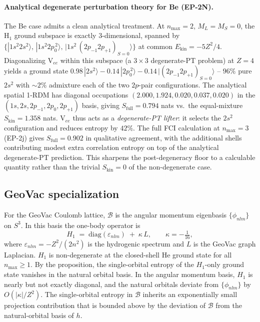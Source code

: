 \documentclass[twocolumn,pra,amsmath,amssymb,superscriptaddress]{revtex4-2}
\begin{document}
\paragraph*{Analytical degenerate perturbation theory for Be
(EP-2N).}  The Be case admits a clean analytical treatment.
At $n_{\max}=2$, $M_L=M_S=0$, the H$_1$ ground subspace
is exactly $3$-dimensional, spanned by
$\{|1s^{2}2s^{2}\rangle,\, |1s^{2}2p_{0}^{\,2}\rangle,\,
|1s^{2}\,(2p_{-1}2p_{+1})_{S=0}\rangle\}$ at common
$E_{\mathrm{kin}} = -5Z^{2}/4$.  Diagonalizing V$_{ee}$ within
this subspace (a $3\times 3$ degenerate-PT problem) at $Z=4$
yields a ground state $0.98\,|2s^{2}\rangle - 0.14\,|2p_{0}^{\,2}\rangle
- 0.14\,|(2p_{-1}2p_{+1})_{S=0}\rangle$ -- $96\%$ pure
$2s^{2}$ with $\sim 2\%$ admixture each of the two
$2p$-pair configurations.  The analytical spatial 1-RDM has
diagonal occupations $(2.000, 1.924, 0.020, 0.037, 0.020)$ in
the $(1s, 2s, 2p_{-1}, 2p_{0}, 2p_{+1})$ basis, giving
$S_{\mathrm{full}} = 0.794$ nats vs.\ the equal-mixture
$S_{\mathrm{kin}} = 1.358$ nats.  V$_{ee}$ thus acts as a
\emph{degenerate-PT lifter}: it selects the $2s^{2}$
configuration and reduces entropy by $42\%$.  The full FCI
calculation at $n_{\max}=3$ (EP-2j) gives $S_{\mathrm{full}}
= 0.902$ in qualitative agreement, with the additional
shells contributing modest extra correlation entropy on top of
the analytical degenerate-PT prediction.  This sharpens the
post-degeneracy floor to a calculable quantity rather than
the trivial $S_{\mathrm{kin}}=0$ of the non-degenerate case.

\subsection{GeoVac specialization}

For the GeoVac Coulomb lattice, $\mathcal{B}$ is the angular
momentum eigenbasis $\{\phi_{nlm}\}$ on $S^{3}$.  In this basis
the one-body operator is
\begin{equation}
  H_1 \;=\; \mathrm{diag}(\varepsilon_{nlm})
  \;+\; \kappa\, L,
  \qquad \kappa = -\tfrac{1}{16},
  \label{eq:h1_geovac}
\end{equation}
where $\varepsilon_{nlm} = -Z^{2}/(2n^{2})$ is the hydrogenic
spectrum and $L$ is the GeoVac graph Laplacian.  $H_1$ is
non-degenerate at the closed-shell He ground state for all
$n_{\max}\geq 1$.  By the proposition, the single-orbital
entropy of the $H_1$-only ground state vanishes in the natural
orbital basis.  In the angular momentum basis, $H_1$ is nearly
but not exactly diagonal, and the natural orbitals deviate from
$\{\phi_{nlm}\}$ by $O(|\kappa|/Z^{2})$.  The single-orbital
entropy in $\mathcal{B}$ inherits an exponentially small
projection contribution that is bounded above by the deviation
of $\mathcal{B}$ from the natural-orbital basis of $h$.
\end{document}
